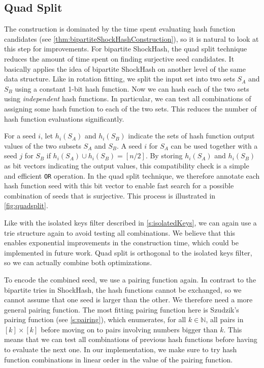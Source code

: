 \documentclass[a4paper,USenglish,cleveref]{lipics-v2021}
\begin{document}
\subsection{Quad Split}\label{s:quadsplit}
The construction is dominated by the time spent evaluating hash function candidates (see \cref{thm:bipartiteShockHashConstruction}), so it is natural to look at this step for improvements.
For bipartite ShockHash, the quad split technique reduces the amount of time spent on finding surjective seed candidates.
It basically applies the idea of bipartite ShockHash on another level of the same data structure.
Like in rotation fitting, we split the input set into two sets $S_A$ and $S_B$ using a constant 1-bit hash function.
Now we can hash each of the two sets using \emph{independent} hash functions.
In particular, we can test all combinations of assigning some hash function to each of the two sets.
This reduces the number of hash function evaluations significantly.

For a seed $i$, let $h_i(S_A)$ and $h_i(S_B)$ indicate the sets of hash function output values of the two subsets $S_A$ and $S_B$.
A seed $i$ for $S_A$ can be used together with a seed $j$ for $S_B$ if $h_i(S_A) \cup h_i(S_B) = [n/2]$.
By storing $h_i(S_A)$ and $h_i(S_B)$ as bit vectors indicating the output values, this compatibility check is a simple and efficient \texttt{OR} operation.
In the quad split technique, we therefore annotate each hash function seed with this bit vector to enable fast search for a possible combination of seeds that is surjective.
This process is illustrated in \cref{fig:quadsplit}.

Like with the isolated keys filter described in \cref{s:isolatedKeys}, we can again use a trie structure again to avoid testing all combinations.
We believe that this enables exponential improvements in the construction time, which could be implemented in future work.
Quad split is orthogonal to the isolated keys filter, so we can actually combine both optimizations.

To encode the combined seed, we use a pairing function again.
In contrast to the bipartite tries in ShockHash, the hash functions cannot be exchanged, so we cannot assume that one seed is larger than the other.
We therefore need a more general pairing function.
The most fitting pairing function here is Szudzik's pairing function (see \cref{s:pairing}),
which enumerates, for all $k \in \mathbb{N}$, all pairs in $[k]\times[k]$ before moving on to pairs involving numbers bigger than $k$.
%
%
%
This means that we can test all combinations of previous hash functions before having to evaluate the next one.
In our implementation, we make sure to try hash function combinations in linear order in the value of the pairing function.
\end{document}
